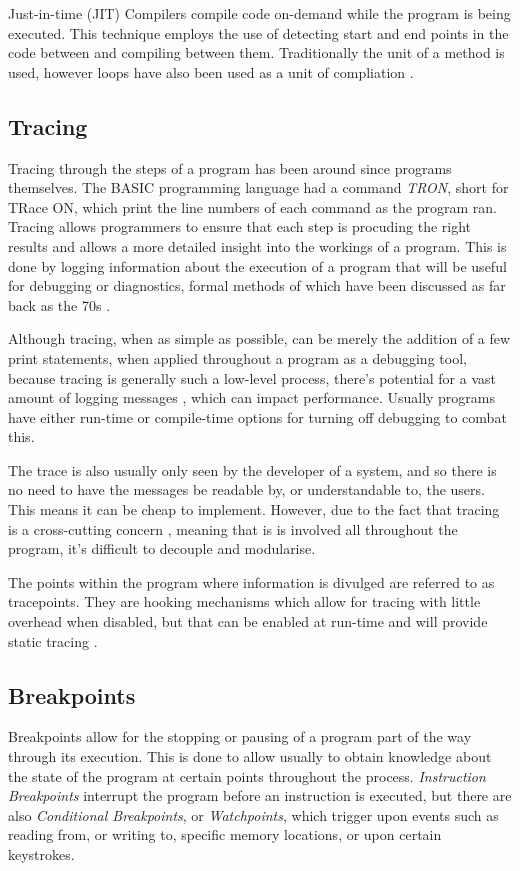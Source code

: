 \documentclass{UoYCSproject}
\begin{document}
Just-in-time (JIT) Compilers compile code on-demand while the program is being executed. This technique employs the use of detecting start and end points in the code between and compiling between them. Traditionally the unit of a method is used, however loops have also been used as a unit of compliation \cite{jit_trace}.

\subsection{Tracing}
Tracing through the steps of a program has been around since programs themselves. The BASIC programming language had a command \emph{TRON}, short for TRace ON, which print the line numbers of each command as the program ran. 
Tracing allows programmers to ensure that each step is procuding the right results and allows a more detailed insight into the workings of a program. This is done by logging information about the execution of a program that will be useful for debugging or diagnostics, formal methods of which have been discussed as far back as the 70s \cite{psych_debug, code_walkthroughs}.

Although tracing, when as simple as possible, can be merely the addition of a few print statements, when applied throughout a program as a debugging tool, because tracing is generally such a low-level process, there's potential for a vast amount of logging messages \cite{tracing_book}, which can impact performance. Usually programs have either run-time or compile-time options for turning off debugging to combat this.

The trace is also usually only seen by the developer of a system, and so there is no need to have the messages be readable by, or understandable to, the users. This means it can be cheap to implement. However, due to the fact that tracing is a cross-cutting concern \cite{wiki_tracing}, meaning that is is involved all throughout the program, it's difficult to decouple and modularise.

The points within the program where information is divulged are referred to as tracepoints. They are hooking mechanisms which allow for tracing with little overhead when disabled, but that can be enabled at run-time and will provide static tracing \cite{tracing_book}.

\subsection{Breakpoints}
Breakpoints allow for the stopping or pausing of a program part of the way through its execution. This is done to allow usually to obtain knowledge about the state of the program at certain points throughout the process. \emph{Instruction Breakpoints} interrupt the program before an instruction is executed, but there are also \emph{Conditional Breakpoints}, or \emph{Watchpoints}, which trigger upon events such as reading from, or writing to, specific memory locations, or upon certain keystrokes.
\end{document}
